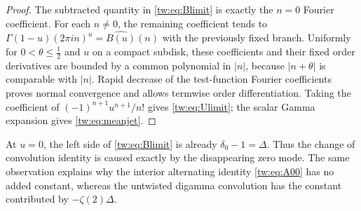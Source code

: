 \begin{proof}
The subtracted quantity in \eqref{tw:eq:Blimit} is exactly the
$n=0$ Fourier coefficient. For each $n\ne0$, the remaining
coefficient tends to
$\Gamma(1-u)(2\pi in)^u=\widehat{B(u)}(n)$ with the previously
fixed branch. Uniformly for $0<\theta\le\tfrac12$ and $u$ on a
compact subdisk, these coefficients and their fixed order
derivatives are bounded by a common polynomial in $|n|$, because
$|n+\theta|$ is comparable with $|n|$. Rapid decrease of the
test-function Fourier coefficients proves normal convergence and
allows termwise order differentiation. Taking the coefficient of
$(-1)^{n+1}u^{n+1}/n!$ gives \eqref{tw:eq:Ulimit}; the scalar
Gamma expansion gives \eqref{tw:eq:meanjet}.
\end{proof}

At $u=0$, the left side of \eqref{tw:eq:Blimit} is already
$\delta_0-1=\Delta$. Thus the change of convolution identity is
caused exactly by the disappearing zero mode. The same observation
explains why the interior alternating identity
\eqref{tw:eq:A00} has no added constant, whereas the untwisted
digamma convolution has the constant contributed by
$-\zeta(2)\Delta$.
